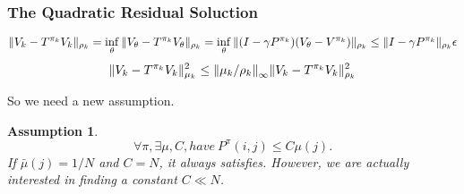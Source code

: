 \documentclass[a4paper]{article}
\newtheorem{assumption}{Assumption}
\begin{document}
\subsubsection{The Quadratic Residual Soluction}%

\[
    \Arrowvert V_k - T^{\pi_{k}} V_{k} \Arrowvert_{\rho_k} = \inf_{\theta} \Arrowvert V_{\theta} - T^{\pi_k} V_{\theta} \Arrowvert_{\rho_k} = \inf_{\theta} \Arrowvert (I - \gamma P^{\pi_k})(V_{\theta} - V^{\pi_k}) \Arrowvert_{\rho_k} \le \Arrowvert I - \gamma P^{\pi_k} \Arrowvert_{\rho_k} \epsilon
\]
\[
    \Arrowvert V_k - T^{\pi_k} V_k \Arrowvert^2_{\mu_k} \le {\Arrowvert \mu_k / \rho_k \Arrowvert}_\infty \Arrowvert V_k - T^{\pi_k} V_k \Arrowvert^2_{\rho_k}
\]

So we need a new assumption.
\begin{assumption}
\[
    \forall \pi, \exists \mu,C, have\ P^{\pi}(i,j) \le C \mu(j).
\]
If $ \bar\mu(j) = 1/N $ and $ C = N $, it always satisfies. However, we are actually interested in finding a constant $ C \ll N $.
\end{assumption}
\end{document}
